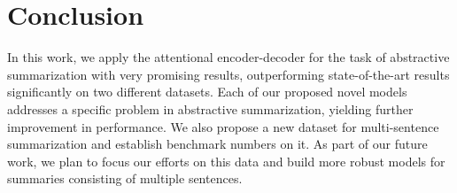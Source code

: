 \section{Conclusion}\label{sec:conclusion}
In this work, we apply the attentional encoder-decoder for the task of abstractive summarization with very promising results, outperforming state-of-the-art results significantly on two different datasets. Each of our proposed novel models addresses a specific problem in abstractive summarization, yielding further improvement in performance. We also propose a new dataset for multi-sentence summarization and establish benchmark numbers on it. As part of our future work, we plan to focus our efforts on this data and build more robust models for summaries consisting of multiple sentences.



